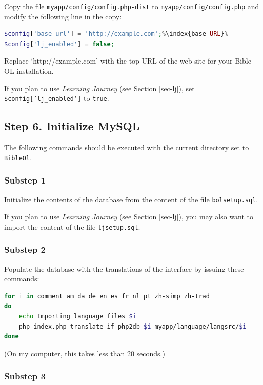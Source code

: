 \documentclass[11pt,oneside,a4paper]{memoir}
\begin{document}
Copy the file \texttt{myapp/config/config.php-dist} to \texttt{myapp/config/config.php} and modify the
following line in the copy:

\begin{lstlisting}[language=PHP]
$config['base_url'] = 'http://example.com';%\index{base URL}%
$config['lj_enabled'] = false;
\end{lstlisting}

Replace `http://example.com' with the top URL of the web site for your Bible OL installation.

If you plan to use \emph{Learning Journey} (see Section \ref{sec-lj}), set \texttt{\$config['lj\_enabled']} to \texttt{true}.


\subsection{Step 6. Initialize MySQL}

The following commands should be executed with the current directory set to \texttt{BibleOl}.

\subsubsection*{Substep 1}

Initialize the contents of the database from the content of the file \texttt{bolsetup.sql}.

If you plan to use \emph{Learning Journey} (see Section \ref{sec-lj}), you may also want to import
the content of the file \texttt{ljsetup.sql}.


\subsubsection*{Substep 2}

Populate the database with the translations of the interface by issuing these commands:

\begin{lstlisting}[language=bash]
for i in comment am da de en es fr nl pt zh-simp zh-trad
do
    echo Importing language files $i
    php index.php translate if_php2db $i myapp/language/langsrc/$i
done
\end{lstlisting}

(On my computer, this takes less than 20 seconds.)

\subsubsection*{Substep 3}
\end{document}
